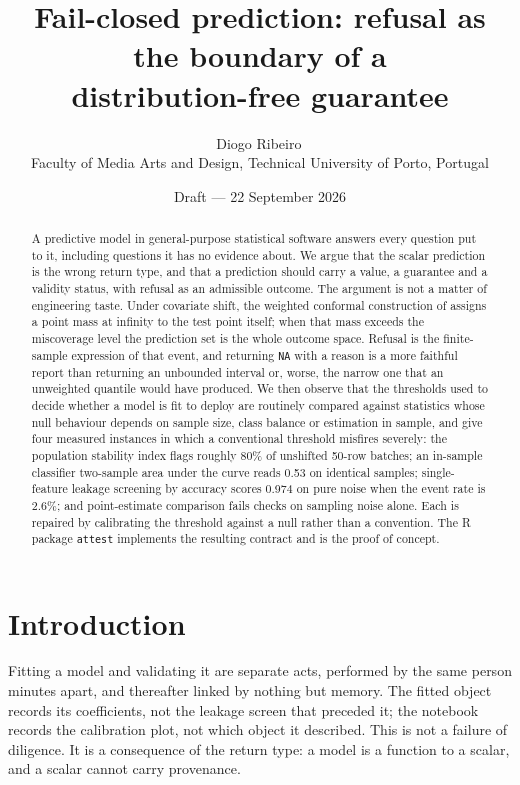 \documentclass[11pt,a4paper]{article}
\title{Fail-closed prediction: refusal as the boundary of a\\
distribution-free guarantee}
\author{%
  Diogo Ribeiro\,\orcidlink{0009-0001-2022-7072}\\[2pt]
  \small Faculty of Media Arts and Design, Technical University of Porto,
  Portugal
}
\date{Draft --- 22 September 2026}
\theoremstyle{definition}
\begin{document}
\maketitle

\begin{abstract}
A predictive model in general-purpose statistical software answers every
question put to it, including questions it has no evidence about. We argue
that the scalar prediction is the wrong return type, and that a prediction
should carry a value, a guarantee and a validity status, with refusal as an
admissible outcome. The argument is not a matter of engineering taste. Under
covariate shift, the weighted conformal construction of
\citet{tibshirani2019} assigns a point mass at infinity to the test point
itself; when that mass exceeds the miscoverage level the prediction set is the
whole outcome space. Refusal is the finite-sample expression of that event, and
returning \texttt{NA} with a reason is a more faithful report than returning an
unbounded interval or, worse, the narrow one that an unweighted quantile would
have produced. We then observe that the thresholds used to decide whether a
model is fit to deploy are routinely compared against statistics whose null
behaviour depends on sample size, class balance or estimation in sample, and
give four measured instances in which a conventional threshold misfires
severely: the population stability index flags roughly 80\% of unshifted
50-row batches; an in-sample classifier two-sample area under the curve reads
0.53 on identical samples; single-feature leakage screening by accuracy scores
0.974 on pure noise when the event rate is 2.6\%; and point-estimate
comparison fails checks on sampling noise alone. Each is repaired by
calibrating the threshold against a null rather than a convention. The
\textsf{R} package \texttt{attest} implements the resulting contract and is
the proof of concept.
\end{abstract}

\section{Introduction}

Fitting a model and validating it are separate acts, performed by the same
person minutes apart, and thereafter linked by nothing but memory. The fitted
object records its coefficients, not the leakage screen that preceded it; the
notebook records the calibration plot, not which object it described. This is
not a failure of diligence. It is a consequence of the return type: a model is
a function to a scalar, and a scalar cannot carry provenance.
\end{document}
